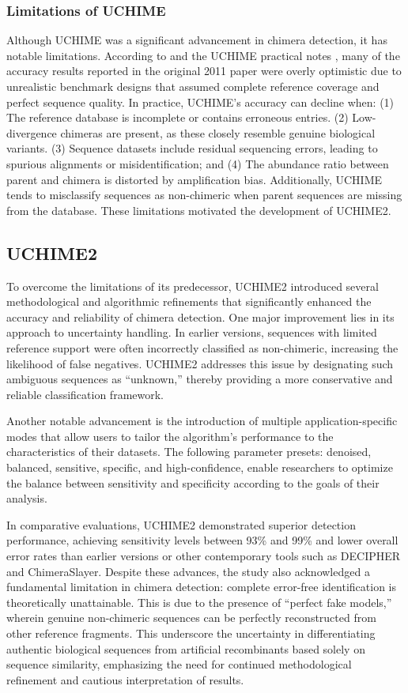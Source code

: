 \subsubsection{Limitations of UCHIME}
Although UCHIME was a significant advancement in chimera detection, it has notable limitations. According to \citep{Edgar2016} and the UCHIME practical notes \citep{EdgarManual}, many of the accuracy results reported in the original 2011 paper were overly optimistic due to unrealistic benchmark designs that assumed complete reference coverage and perfect sequence quality. In practice, UCHIME’s accuracy can decline when: (1) The reference database is incomplete or contains erroneous entries. (2) Low-divergence chimeras are present, as these closely resemble genuine biological variants. (3) Sequence datasets include residual sequencing errors, leading to spurious alignments or misidentification; and (4) The abundance ratio between parent and chimera is distorted by amplification bias. Additionally, UCHIME tends to misclassify sequences as non-chimeric when parent sequences are missing from the database. These limitations motivated the development of UCHIME2.

\subsection{UCHIME2}
To overcome the limitations of its predecessor, UCHIME2 \citep{Edgar2016} introduced several methodological and algorithmic refinements that significantly enhanced the accuracy and reliability of chimera detection. One major improvement lies in its approach to uncertainty handling. In earlier versions, sequences with limited reference support were often incorrectly classified as non-chimeric, increasing the likelihood of false negatives. UCHIME2 addresses this issue by designating such ambiguous sequences as “unknown,” thereby providing a more conservative and reliable classification framework.

Another notable advancement is the introduction of multiple application-specific modes that allow users to tailor the algorithm’s performance to the characteristics of their datasets. The following parameter presets: denoised, balanced, sensitive, specific, and high-confidence, enable researchers to optimize the balance between sensitivity and specificity according to the goals of their analysis.

In comparative evaluations, UCHIME2 demonstrated superior detection performance, achieving sensitivity levels between 93\% and 99\% and lower overall error rates than earlier versions or other contemporary tools such as DECIPHER and ChimeraSlayer. Despite these advances, the study also acknowledged a fundamental limitation in chimera detection: complete error-free identification is theoretically unattainable. This is due to the presence of “perfect fake models,” wherein genuine non-chimeric sequences can be perfectly reconstructed from other reference fragments. This underscore the uncertainty in differentiating authentic biological sequences from artificial recombinants based solely on sequence similarity, emphasizing the need for continued methodological refinement and cautious interpretation of results.

